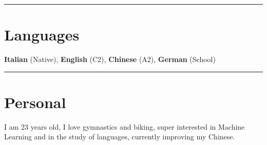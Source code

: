 \documentclass[10pt,a4paper,hidelinks]{article}
\newenvironment{indentsection}[1]%
{\begin{list}{}%
	{\setlength{\leftmargin}{#1}}%
	\item[]%
}
{\end{list}}
\begin{document}

{\color{IFMediumGreen} \hrule}
\vspace{-0.3em}
{\color{IFDarkGreen}\section*{Languages}}

\begin{indentsection}{\parindent}
\begin{flushleft}
    \textbf{Italian} (Native), \textbf{English} (C2),  \textbf{Chinese} (A2), \textbf{German} (School)
\end{flushleft}
\end{indentsection}



{\color{IFMediumGreen} \hrule}
\vspace{-0.3em}
{\color{IFDarkGreen}\section*{Personal}}

\begin{indentsection}{\parindent}
\begin{flushleft}
I am 23 years old, I love gymnastics and biking, super interested in Machine Learning and in the study of languages, currently improving my Chinese.
\end{flushleft}
\end{indentsection}
\end{document}
